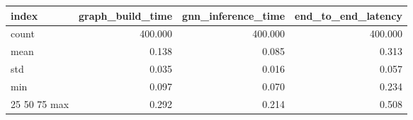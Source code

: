\begin{tabular}{lrrr}
\toprule
index & graph_build_time & gnn_inference_time & end_to_end_latency \\
\midrule
count & 400.000 & 400.000 & 400.000 \\
mean & 0.138 & 0.085 & 0.313 \\
std & 0.035 & 0.016 & 0.057 \\
min & 0.097 & 0.070 & 0.234 \\
25%
50%
75%
max & 0.292 & 0.214 & 0.508 \\
\bottomrule
\end{tabular}
